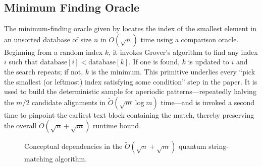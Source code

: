 \documentclass[12pt]{IEEEtran}
\begin{document}
\subsection{Minimum Finding Oracle}
The minimum-finding oracle given by \cite[Durr \& Høyer]{durr1999quantumalgorithmfindingminimum} locates the index of the smallest element in an unsorted database of size \(n\) in \(O(\sqrt{n})\) time using a comparison oracle. Beginning from a random index \(k\), it invokes Grover's algorithm to find any index \(i\) such that \(\text{database}[i]<\text{database}[k]\). If one is found, \(k\) is updated to \(i\) and the search repeats; if not, \(k\) is the minimum. This primitive underlies every ``pick the smallest (or leftmost) index satisfying some condition'' step in the paper. It is used to build the deterministic sample for aperiodic patterns—repeatedly halving the \(m/2\) candidate alignments in \(\widetilde{O}(\sqrt{m}\log m)\) time—and is invoked a second time to pinpoint the earliest text block containing the match, thereby preserving the overall \(\widetilde{O}(\sqrt{n}+\sqrt{m})\) runtime bound.

\begin{figure*}[!t]
  \centering
  \caption{Conceptual dependencies in the $\widetilde{O}(\sqrt{n}+\sqrt{m})$ quantum string-matching algorithm.}
  \label{fig:quantum-string-matching}
\end{figure*}
\end{document}
